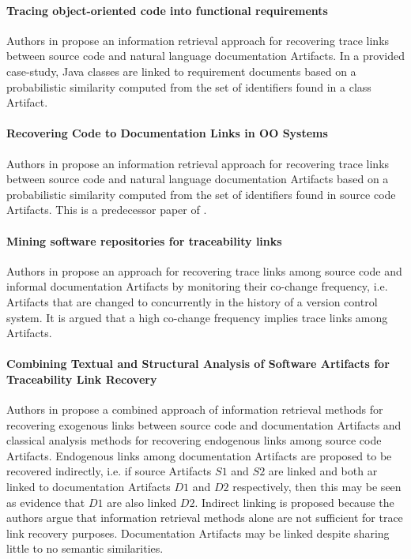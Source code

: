 \paragraph*{Tracing object-oriented code into functional requirements} 
Authors in \cite{DBLP:conf/iwpc/AntoniolCLCM00}
propose an information retrieval approach for recovering trace links between source code and natural language documentation \glspl{Artifact}.
In a provided case-study, \gls{Java} classes are linked to requirement documents based on a probabilistic similarity computed from the set of identifiers found in a class \gls{Artifact}.

\paragraph*{Recovering Code to Documentation Links in OO Systems}
Authors in \cite{DBLP:conf/wcre/AntoniolCLM99}
propose an information retrieval approach for recovering trace links between source code and natural language documentation \glspl{Artifact} based on a  probabilistic similarity computed from the set of identifiers found in source code \glspl{Artifact}.
This is a predecessor paper of \cite{DBLP:conf/iwpc/AntoniolCLCM00}.

\paragraph*{Mining software repositories for traceability links}
Authors in \cite{DBLP:conf/iwpc/KagdiMS07}
propose an approach for recovering trace links among source code and informal documentation \glspl{Artifact} by monitoring their co-change frequency, i.e. \glspl{Artifact} that are changed to concurrently in the history of a version control system.
It is argued that a high co-change frequency implies trace links among \glspl{Artifact}.

\paragraph*{Combining Textual and Structural Analysis of Software Artifacts for  Traceability Link Recovery}
Authors in \cite{DBLP:conf/icse/McMillanPR09}
propose a combined approach of information retrieval methods for recovering exogenous links between source code and documentation \glspl{Artifact} and classical analysis methods for recovering endogenous links among source code \glspl{Artifact}.
Endogenous links among documentation \glspl{Artifact} are proposed to be recovered indirectly, i.e. if source \glspl{Artifact} $S1$ and $S2$ are linked and both ar linked to documentation \glspl{Artifact} $D1$ and $D2$ respectively, then this may be seen as evidence that $D1$ are also linked $D2$.
Indirect linking is proposed because the authors argue that information retrieval methods alone are not sufficient for trace link recovery purposes.
Documentation \glspl{Artifact} may be linked despite sharing little to no semantic similarities.

